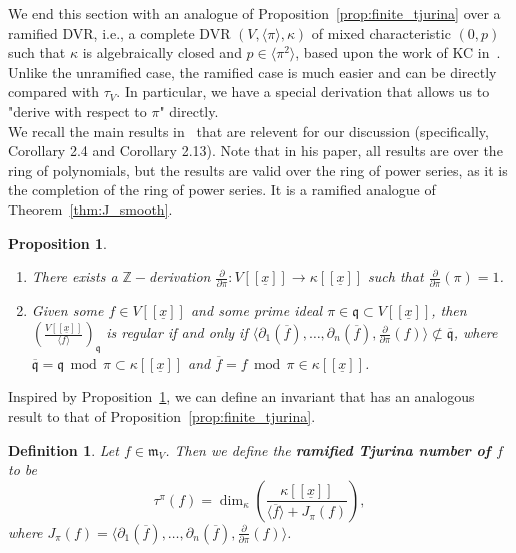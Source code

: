\documentclass{article}
\newtheorem{definition}[theorem]{Definition}
\newtheorem{proposition}[theorem]{Proposition}
\newcommand{\maxV}{\mathfrak{m}_V}
\newcommand{\pder}{\frac{\partial}{\partial \pi}}
\newcommand{\kappax}{\kappa[[\underline{x}]]}
\numberwithin{theorem}{section}
\renewcommand{\mod}{\,\operatorname{mod}\,}
\begin{document}
We end this section with an analogue of Proposition~\ref{prop:finite_tjurina} over a ramified DVR, i.e., a complete DVR $(V, \langle \pi \rangle, \kappa)$ of mixed characteristic $(0,p)$ such that $\kappa$ is algebraically closed and $p \in \langle \pi^2 \rangle$, based upon the work of KC in~\cite{kc2024singular}. Unlike the unramified case, the ramified case is much easier and can be directly compared with $\tau_V$. In particular, we have a special derivation that allows us to "derive with respect to $\pi$" directly. \\

We recall the main results in~\cite{kc2024singular} that are relevent for our discussion (specifically, Corollary 2.4 and Corollary 2.13). Note that in his paper, all results are over the ring of polynomials, but the results are valid over the ring of power series, as it is the completion of the ring of power series. It is a ramified analogue of Theorem~\ref{thm:J_smooth}.

\begin{proposition}\label{prop:ramified_J}
    \begin{enumerate}
        \item There exists a $\mathbb{Z}-$derivation $\pder \colon V[[\underline{x}]] \to \kappa[[\underline{x}]]$ such that $\pder(\pi)=1$. 
        \item Given some $f \in V[[\underline{x}]]$ and some prime ideal $\pi \in \mathfrak{q} \subset V[[\underline{x}]]$, then $\left( \frac{V[[\underline{x}]]}{\langle f \rangle} \right)_{\mathfrak{q}}$ is regular if and only if $\langle \partial_1(\overline{f}), \dots, \partial_n(\overline{f}), \pder(f) \rangle \not\subset \overline{\mathfrak{q}}$, where $\overline{\mathfrak{q}} = \mathfrak{q} \mod \pi \subset \kappax$ and $\overline{f} = f \mod \pi \in \kappax$. 
    \end{enumerate}
\end{proposition}

Inspired by Proposition~\ref{prop:ramified_J}, we can define an invariant that has an analogous result to that of Proposition~\ref{prop:finite_tjurina}. 

\begin{definition}\label{def:pitjurina}
    Let $f \in \maxV$. Then we define the \textbf{ramified Tjurina number of $f$} to be 
    \begin{equation*}
        \tau^\pi(f)=\dim_\kappa\left(\frac{\kappa[[\underline{x}]]}{\langle \overline{f} \rangle + J_\pi(f)} \right),
    \end{equation*}
    where $J_\pi(f) = \langle \partial_1(\overline{f}), \dots, \partial_n(\overline{f}), \pder(f) \rangle$.
\end{definition}
\end{document}
